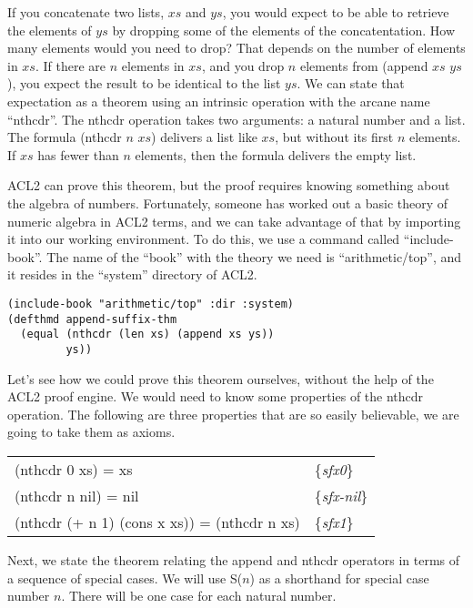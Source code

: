 If you concatenate two lists, $xs$ and $ys$, you would expect to be able to retrieve the elements of $ys$ by dropping some of the elements of the concatentation. How many elements would you need to drop? That depends on the number of elements in $xs$. If there are $n$ elements in $xs$, and you drop $n$ elements from (append $xs$ $ys$), you expect the result to be identical to the list $ys$. We can state that expectation as a theorem using an intrinsic operation with the arcane name ``nthcdr''. The nthcdr operation takes two arguments: a natural number and a list. The formula (nthcdr $n$ $xs$) delivers a list like $xs$, but without its first $n$ elements. If $xs$ has fewer than $n$ elements, then the formula delivers the empty list.

ACL2 can prove this theorem, but the proof requires knowing something about the algebra of numbers. Fortunately, someone has worked out a basic theory of numeric algebra in ACL2 terms, and we can take advantage of that by importing it into our working environment. To do this, we use a command called ``include-book''. The name of the ``book'' with the theory we need is ``arithmetic/top'', and it resides in the ``system'' directory of ACL2.

\begin{lstlisting}
(include-book "arithmetic/top" :dir :system)
(defthmd append-suffix-thm
  (equal (nthcdr (len xs) (append xs ys))
         ys))
\end{lstlisting}

Let's see how we could prove this theorem ourselves, without the help of the ACL2 proof engine. We would need to know some properties of the nthcdr operation. The following are three properties that are so easily believable, we are going to take them as axioms.

\label{nthcdr-equations}
\begin{center}
\begin{tabular}{ll}
(nthcdr 0 xs) = xs                           & \{\emph{sfx0}\}     \\
(nthcdr n nil) =  nil                        & \{\emph{sfx-nil}\}  \\
(nthcdr (+ n 1) (cons x xs)) = (nthcdr n xs) & \{\emph{sfx1}\}     \\
\end{tabular}
\end{center}

\begin{comment} 
\todo{Rex: sfx1 isn't true, right?  I'm not sure we want to introduce it as an axiom, if later we'll have to explain it isn't really true.}
\end{comment}
Next, we state the theorem relating the append and nthcdr operators in terms of a sequence of special cases. We will use S($n$) as a shorthand for special case number $n$. There will be one case for each natural number.

